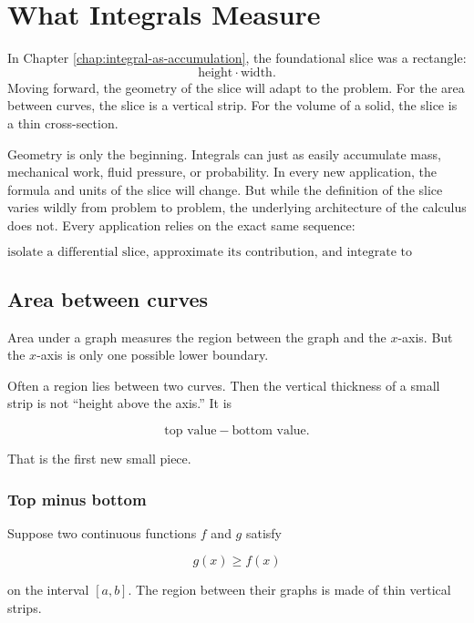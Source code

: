 
\chapter{What Integrals Measure}
\label{chap:what-integrals-measure}

In Chapter \ref{chap:integral-as-accumulation}, the foundational slice was a rectangle: 
\[
\text{height}\cdot\text{width}.
\]
Moving forward, the geometry of the slice will adapt to the problem. For the area between curves, the slice is a vertical strip. For the volume of a solid, the slice is a thin cross-section. 

Geometry is only the beginning. Integrals can just as easily accumulate mass, mechanical work, fluid pressure, or probability. In every new application, the formula and units of the slice will change. But while the definition of the slice varies wildly from problem to problem, the underlying architecture of the calculus does not. Every application relies on the exact same sequence:

\[
\boxed{
\text{isolate a differential slice, approximate its contribution, and integrate to accumulate the total.}
}
\]

\section{Area between curves}
\label{sec:area-between-curves}

Area under a graph measures the region between the graph and the \(x\)-axis.  But the
\(x\)-axis is only one possible lower boundary.

Often a region lies between two curves.  Then the vertical thickness of a small strip is
not ``height above the axis.''  It is

\[
\text{top value}-\text{bottom value}.
\]

That is the first new small piece.

\subsection{Top minus bottom}
\label{subsec:top-minus-bottom}

Suppose two continuous functions \(f\) and \(g\) satisfy

\[
g(x)\ge f(x)
\]

on the interval \([a,b]\).  The region between their graphs is made of thin vertical
strips.

